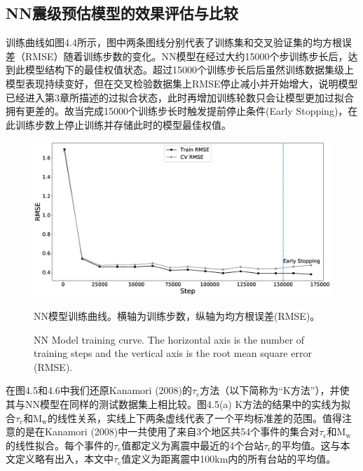 \subsection{NN震级预估模型的效果评估与比较}
\indent 训练曲线如图4.4所示，图中两条图线分别代表了训练集和交叉验证集的均方根误差（RMSE）随着训练步数的变化。NN模型在经过大约15000个步训练步长后，达到此模型结构下的最佳权值状态。超过15000个训练步长后后虽然训练数据集级上模型表现持续变好，但在交叉检验数据集上RMSE停止减小并开始增大，说明模型已经进入第3章所描述的过拟合状态，此时再增加训练轮数只会让模型更加过拟合拥有更差的。故当完成15000个训练步长时触发提前停止条件(Early Stopping)，在此训练步数上停止训练并存储此时的模型最佳权值。\\
\begin{figure}[!h] 
\centering 
 \includegraphics[width=0.9\linewidth]{img/6.eps} 
 \renewcommand{\figurename}{图} 
\caption{NN模型训练曲线。横轴为训练步数，纵轴为均方根误差(RMSE)。} 
\addtocounter{figure}{-1} \vspace{-5pt} 
\renewcommand{\figurename}{Fig} 
\caption{NN Model training curve. The horizontal axis is the number of training steps and the vertical axis is the root mean square error (RMSE).} 
\renewcommand{\figurename}{图} 
\label{fig:network-device-influence.png} 
\end{figure}
\indent 在图4.5和4.6中我们还原Kanamori (2008)的$\tau_{\mathrm{c}}$方法（以下简称为“K方法”），并使其与NN模型在同样的测试数据集上相比较。图4.5(a) K方法的结果中的实线为拟合$\tau_{\mathrm{c}}$和$\mathrm{M}_{\mathrm{w}}$的线性关系，实线上下两条虚线代表了一个平均标准差的范围。值得注意的是在Kanamori (2008)中一共使用了来自3个地区共54个事件的集合对$\tau_{\mathrm{c}}$和$\mathrm{M}_{\mathrm{w}}$的线性拟合。每个事件的$\tau_{\mathrm{c}}$值都定义为离震中最近的4个台站$\tau_{\mathrm{c}}$的平均值。这与本文定义略有出入，本文中$\tau_{\mathrm{c}}$值定义为距离震中100km内的所有台站的平均值。\\
